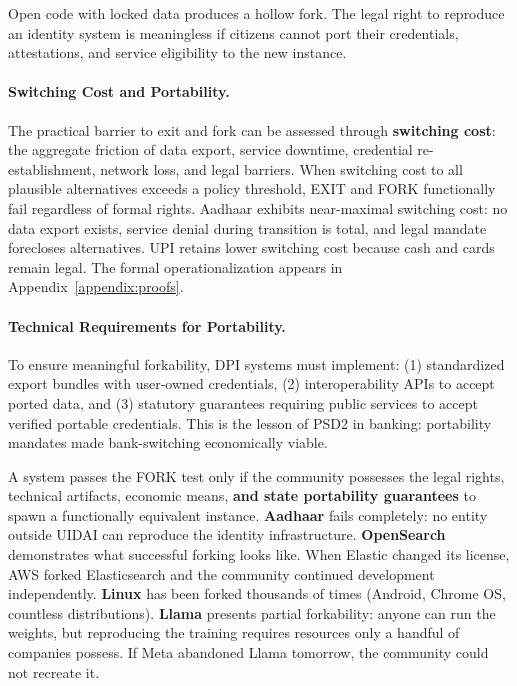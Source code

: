 \documentclass{article}
\begin{document}
Open code with locked data produces a hollow fork. The legal right to reproduce an identity system is meaningless if citizens cannot port their credentials, attestations, and service eligibility to the new instance.

\paragraph{Switching Cost and Portability.} The practical barrier to exit and fork can be assessed through \textbf{switching cost}: the aggregate friction of data export, service downtime, credential re-establishment, network loss, and legal barriers. When switching cost to all plausible alternatives exceeds a policy threshold, EXIT and FORK functionally fail regardless of formal rights. Aadhaar exhibits near-maximal switching cost: no data export exists, service denial during transition is total, and legal mandate forecloses alternatives. UPI retains lower switching cost because cash and cards remain legal. The formal operationalization appears in Appendix~\ref{appendix:proofs}.

\paragraph{Technical Requirements for Portability.} To ensure meaningful forkability, DPI systems must implement: (1) standardized export bundles with user-owned credentials, (2) interoperability APIs to accept ported data, and (3) statutory guarantees requiring public services to accept verified portable credentials. This is the lesson of PSD2 in banking: portability mandates made bank-switching economically viable.

A system passes the FORK test only if the community possesses the legal rights, technical artifacts, economic means, \textbf{and state portability guarantees} to spawn a functionally equivalent instance. \textbf{Aadhaar} fails completely: no entity outside UIDAI can reproduce the identity infrastructure. \textbf{OpenSearch} demonstrates what successful forking looks like. When Elastic changed its license, AWS forked Elasticsearch and the community continued development independently. \textbf{Linux} has been forked thousands of times (Android, Chrome OS, countless distributions). \textbf{Llama} presents partial forkability: anyone can run the weights, but reproducing the training requires resources only a handful of companies possess. If Meta abandoned Llama tomorrow, the community could not recreate it.
\end{document}
